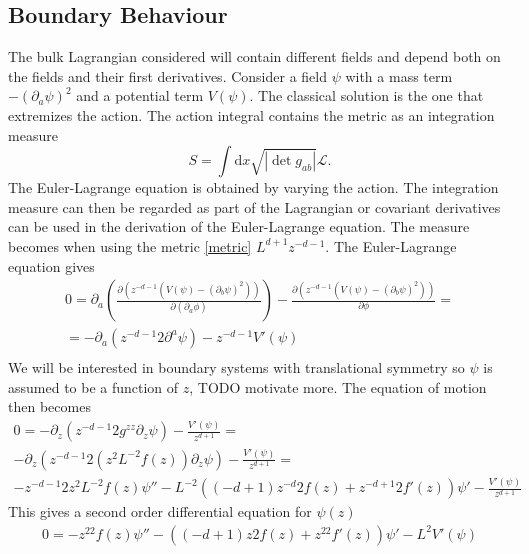 \documentclass[12pt]{book}
\renewcommand{\d}{\ensuremath{\mathrm{d}}}
\renewcommand{\L}{\ensuremath{\mathcal{L}}}
\begin{document}
\subsection{Boundary Behaviour}
The bulk Lagrangian considered will contain different fields and depend both on the fields and their first derivatives. Consider a field $\psi$ with a mass term $-(\partial_a\psi)^2$ and a potential term $V(\psi)$. The classical solution is the one that extremizes the action. The action integral contains the metric as an integration measure
\begin{equation}
 S=\int\d x\sqrt{|\det g_{ab}|}\L.
\end{equation}
The Euler-Lagrange equation is obtained by varying the action. The integration measure can then be regarded as part of the Lagrangian or covariant derivatives can be used in the derivation of the Euler-Lagrange equation. The measure becomes when using the metric \eqref{metric} $L^{d+1}z^{-d-1}$. The Euler-Lagrange equation gives
\begin{equation}
\begin{split}
 0=\partial_a\left(\frac{\partial (z^{-d-1}(V(\psi)-(\partial_b\psi)^2)) }{\partial(\partial_a\phi)}\right)-\frac{\partial  (z^{-d-1}(V(\psi)-(\partial_b\psi)^2) )}{\partial\phi}=\\
 =-\partial_a\left(z^{-d-1}2\partial^a\psi\right)-z^{-d-1}V'(\psi)\\
\end{split}
\end{equation}
We will be interested in boundary systems with translational symmetry so $\psi$ is assumed to be a function of $z$, TODO motivate more. The equation of motion then becomes
\begin{equation}
\begin{split}
0=-\partial_z\left(z^{-d-1}2g^{zz}\partial_z\psi\right)  -\frac{V'(\psi)}{z^{d+1}}=\\
-\partial_z\left(z^{-d-1}2(z^2L^{-2}f(z))\partial_z\psi\right)  -\frac{V'(\psi)}{z^{d+1}}=\\
-z^{-d-1}2z^2L^{-2}f(z)\psi''-L^{-2}\left((-d+1)z^{-d}2f(z) + z^{-d+1}2f'(z)\right)\psi' -\frac{V'(\psi)}{z^{d+1}}
\end{split}
\end{equation}
This gives a second order differential equation for $\psi(z)$
\begin{equation}
\begin{split}
0=-z^22f(z)\psi''-\left((-d+1)z2f(z) + z^22f'(z)\right)\psi' -L^2V'(\psi)
\end{split}
\end{equation}
\end{document}

